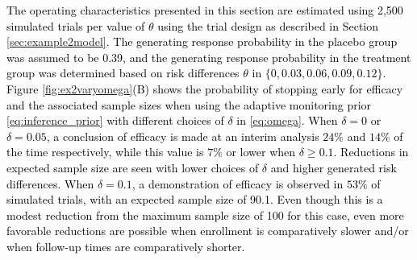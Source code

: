 \documentclass[12pt]{article}
\begin{document}
\textcolor{black}{
The operating characteristics presented in this section are estimated using 2,500 simulated trials per value of $\theta$ using the trial design as described in Section \ref{sec:example2model}. The generating response probability in the placebo group was assumed to be 0.39, and the generating response probability in the treatment group was determined based on risk differences $\theta$ in $\{0, 0.03, 0.06, 0.09, 0.12\}$. Figure \ref{fig:ex2varyomega}(B) shows the probability of stopping early for efficacy and the associated sample sizes when using the adaptive monitoring prior \eqref{eq:inference_prior} with different choices of $\delta$ in \eqref{eq:omega}. When $\delta=0$ or $\delta=0.05$, a conclusion of efficacy is made at an interim analysis $24\%$ and $14\%$ of the time respectively, while this value is $7\%$ or lower when $\delta \geq 0.1$. Reductions in expected sample size are seen with lower choices of $\delta$ and higher generated risk differences. When $\delta=0.1$, a demonstration of efficacy is observed in $53\%$ of simulated trials, with an expected sample size of 90.1. Even though this is a modest reduction from the maximum sample size of 100 for this case, even more favorable reductions are possible when enrollment is comparatively slower and/or when follow-up times are comparatively shorter.}
\end{document}

